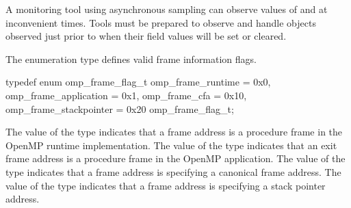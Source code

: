 %
%
%
%

\begin{note}
A monitoring tool using asynchronous sampling can observe values
of  and  at inconvenient times.
Tools must be prepared to observe and handle 
objects observed just prior to when their field values will be set or
cleared.
\end{note}


\summary
The  enumeration type defines valid frame information
flags.

\syntax
\begin{ccppspecific}
\begin{ompSyntax}
typedef enum omp_frame_flag_t {
  omp_frame_runtime        = 0x0,
  omp_frame_application    = 0x1,
  omp_frame_cfa            = 0x10,
  omp_frame_stackpointer   = 0x20
} omp_frame_flag_t; 
\end{ompSyntax}
\end{ccppspecific}

\descr
The value  of the  type
indicates that a frame address is a procedure frame in the OpenMP
runtime implementation.
The value  of the  type
indicates that an exit frame address is a procedure frame in the OpenMP
application.
The value  of the  type
indicates that a frame address is specifying a canonical frame address.
The value  of the  type
indicates that a frame address is specifying a stack pointer address.
